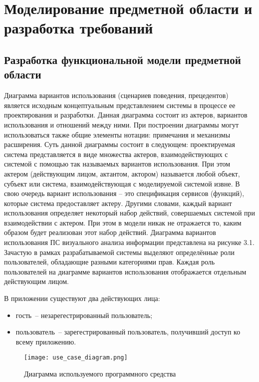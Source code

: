 \section{Моделирование предметной области и разработка требований}
\label{sec:func}
 
\subsection{Разработка функциональной модели предметной области}
Диаграмма вариантов использования (сценариев поведения, прецедентов) является исходным концептуальным представлением системы в процессе ее проектирования и разработки. Данная диаграмма состоит из актеров, вариантов использования и отношений между ними. При построении диаграммы могут использоваться также общие элементы нотации: примечания и механизмы расширения.
Суть данной диаграммы состоит в следующем: проектируемая система представляется в виде множества актеров, взаимодействующих с системой с помощью так называемых вариантов использования. При этом актером (действующим лицом, актантом, актором) называется любой объект, субъект или система, взаимодействующая с моделируемой системой извне. В свою очередь вариант использования – это спецификация сервисов (функций), которые система предоставляет актеру. Другими словами, каждый вариант использования определяет некоторый набор действий, совершаемых системой при взаимодействии с актером. При этом в модели никак не отражается то, каким образом будет реализован этот набор действий.
Диаграмма вариантов использования ПС визуального анализа информации представлена на рисунке 3.1.
Зачастую в рамках разрабатываемой системы выделяют определённые роли пользователей, обладающие разными категориями прав. Каждая роль пользователей на диаграмме вариантов использования отображается отдельным действующим лицом.

В приложении существуют два действующих лица:
\begin{itemize}
  \item гость~-- незарегестрированный пользователь;
  \item пользователь~-- зарегестрированный пользователь, получивший доступ ко всему приложению.
\end{itemize}

\begin{figure}[H]
 \centering
   \texttt{[image: use\_case\_diagram.png]} 
   \caption{Диаграмма используемого программного средства}
   \label{fig:domain:use_case_diagram}
\end{figure}


